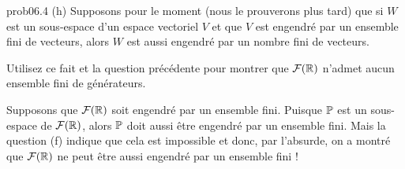 \begin{sol}{prob06.4}
(h) Supposons pour le moment (nous le prouverons plus tard) que si $W$ est un sous-espace d'un espace vectoriel $V$ et que $V$ est engendr\'e par un ensemble fini de vecteurs, alors $W$ est aussi engendré par un nombre fini de vecteurs. 

Utilisez ce fait et la question précédente pour montrer que $\mathcal{F}(\mathbb{R})$ n'admet aucun ensemble fini de g\'en\'erateurs.

 
\soln Supposons que $\mathcal{F}(\mathbb{R})$ soit engendré par un ensemble fini. Puisque $\mathbb{P}$ est un sous-espace de $\mathcal{F}(\mathbb{R})$, alors $\mathbb{P}$ doit aussi être engendré par un ensemble fini. Mais la question (f) indique que cela est impossible et donc, par l'absurde, on a montré que $\mathcal{F}(\mathbb{R})$ ne peut \^etre aussi engendr\'e par un ensemble fini !
\medskip 




\end{sol}


